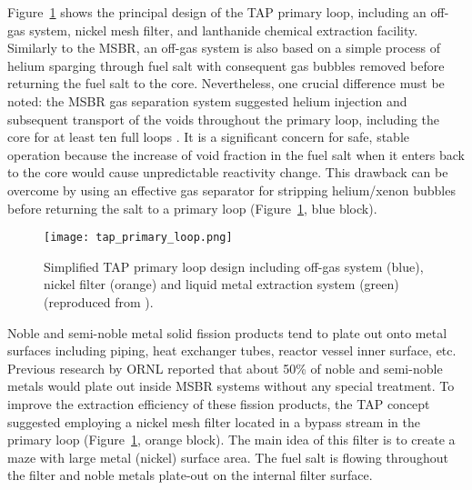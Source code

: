 Figure~\ref{fig:tap-reproc} shows the principal design of the \gls{TAP} 
primary loop, including an off-gas system, nickel mesh filter, and lanthanide 
chemical extraction facility. Similarly to the \gls{MSBR}, an off-gas system 
is also based on a simple process of helium sparging through fuel salt with 
consequent gas bubbles removed before returning the fuel salt to the core. 
Nevertheless, one crucial difference must be noted: the \gls{MSBR} gas 
separation system suggested helium injection and subsequent transport of the 
voids throughout the primary loop, including the core for at least ten full 
loops \cite{robertson_conceptual_1971}. It is a significant concern for safe, 
stable operation because the increase of void fraction in the fuel salt when 
it enters back to the core would cause unpredictable reactivity change. This 
drawback can be overcome by using an effective gas separator for stripping 
helium/xenon bubbles before returning the salt to a primary loop 
(Figure~\ref{fig:tap-reproc}, blue block). 
\begin{figure}[htp!] %
	\centering
	\texttt{[image: tap\_primary\_loop.png]}
	\caption{Simplified \gls{TAP} primary loop design including off-gas system 
	(blue), 
		nickel filter (orange) and liquid metal extraction system (green) 
		(reproduced from \cite{transatomic_power_transatomic_2019}).}
	\label{fig:tap-reproc}
\end{figure}

Noble and semi-noble metal solid fission products tend to plate out onto metal 
surfaces including piping, heat exchanger tubes, reactor vessel inner surface, 
etc. Previous research by \gls{ORNL} \cite{robertson_conceptual_1971} reported 
that about 50\% of noble and semi-noble metals would plate out inside 
\gls{MSBR} systems without any special treatment. To improve the extraction 
efficiency of these fission products, the \gls{TAP} concept suggested 
employing a nickel mesh filter located in a bypass stream in the primary loop 
(Figure~\ref{fig:tap-reproc}, orange block). The main idea of this filter is 
to create a maze with large metal (nickel) surface area. The fuel salt is  
flowing throughout the filter and noble metals plate-out on the internal  
filter surface. 

